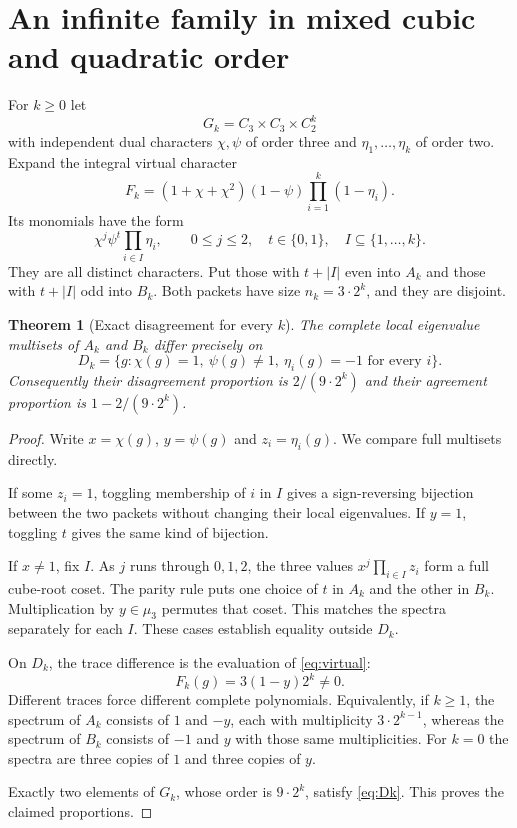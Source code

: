 \documentclass[11pt]{article}
\newtheorem{theorem}{Theorem}[section]
\theoremstyle{remark}\newtheorem{remark}[theorem]{Remark}
\begin{document}
\section{An infinite family in mixed cubic and quadratic order}

For $k\ge0$ let
\[
 G_k=C_3\times C_3\times C_2^k
\]
with independent dual characters $\chi,\psi$ of order three and $\eta_1,\ldots,\eta_k$ of order two. Expand the integral virtual character
\begin{equation}\label{eq:virtual}
 F_k=(1+\chi+\chi^2)(1-\psi)\prod_{i=1}^k(1-\eta_i).
\end{equation}
Its monomials have the form
\[
 \chi^j\psi^t\prod_{i\in I}\eta_i,
 \qquad 0\le j\le2,\quad t\in\{0,1\},\quad I\subseteq\{1,\ldots,k\}.
\]
They are all distinct characters. Put those with $t+|I|$ even into $A_k$ and those with $t+|I|$ odd into $B_k$. Both packets have size $n_k=3\cdot2^k$, and they are disjoint.

\begin{theorem}[Exact disagreement for every $k$]\label{thm:family}
The complete local eigenvalue multisets of $A_k$ and $B_k$ differ precisely on
\begin{equation}\label{eq:Dk}
 D_k=\{g:\chi(g)=1,\ \psi(g)\ne1,\ \eta_i(g)=-1\text{ for every }i\}.
\end{equation}
Consequently their disagreement proportion is $2/(9\cdot2^k)$ and their agreement proportion is $1-2/(9\cdot2^k)$.
\end{theorem}

\begin{proof}
Write $x=\chi(g)$, $y=\psi(g)$ and $z_i=\eta_i(g)$. We compare full multisets directly.

If some $z_i=1$, toggling membership of $i$ in $I$ gives a sign-reversing bijection between the two packets without changing their local eigenvalues. If $y=1$, toggling $t$ gives the same kind of bijection.

If $x\ne1$, fix $I$. As $j$ runs through $0,1,2$, the three values $x^j\prod_{i\in I}z_i$ form a full cube-root coset. The parity rule puts one choice of $t$ in $A_k$ and the other in $B_k$. Multiplication by $y\in\mu_3$ permutes that coset. This matches the spectra separately for each $I$. These cases establish equality outside $D_k$.

On $D_k$, the trace difference is the evaluation of \eqref{eq:virtual}:
\[
 F_k(g)=3(1-y)2^k\ne0.
\]
Different traces force different complete polynomials. Equivalently, if $k\ge1$, the spectrum of $A_k$ consists of $1$ and $-y$, each with multiplicity $3\cdot2^{k-1}$, whereas the spectrum of $B_k$ consists of $-1$ and $y$ with those same multiplicities. For $k=0$ the spectra are three copies of $1$ and three copies of $y$.

Exactly two elements of $G_k$, whose order is $9\cdot2^k$, satisfy \eqref{eq:Dk}. This proves the claimed proportions.
\end{proof}
\end{document}
